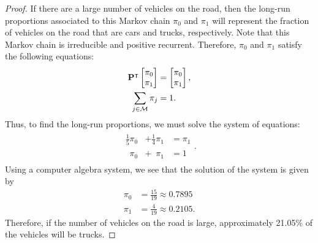 \begin{proof}
  If there are a large number of vehicles on the road, then the long-run proportions
  associated to this Markov chain $\pi_0$ and $\pi_1$ will represent the fraction of vehicles
  on the road that are cars and trucks, respectively.
  Note that this Markov chain is irreducible and positive recurrent. Therefore, $\pi_0$ and $\pi_1$
  satisfy the following equations:
  \begin{align*}
     \bold{P}^\intercal \begin{bmatrix} \pi_0 \\ \pi_1 \\ \end{bmatrix} &= \begin{bmatrix} \pi_0 \\ \pi_1 \\ \end{bmatrix},\\
     \sum_{j\in \mathcal{M}} \pi_j &= 1.
  \end{align*}
  Thus, to find the long-run proportions, we must solve the system of equations:
  \begin{align*}
    \begin{array}{lll}
      \frac{1}{5}\pi_0 &+ \frac{1}{4}\pi_1 &= \pi_1 \\
      \phantom{\frac{1}{5}}\pi_0 &+ \phantom{\frac{1}{4}}\pi_1 &= 1
    \end{array}.
  \end{align*}
  Using a computer algebra system, we see that the solution of the system is given
  by
  \begin{align*}
    \pi_0 &= \frac{15}{19} \approx 0.7895\\
    \pi_1 &= \frac{4}{19} \approx 0.2105.
  \end{align*}
  Therefore, if the number of vehicles on the road is large,
  approximately 21.05\% of the vehicles will be trucks.
\end{proof}
\newpage
